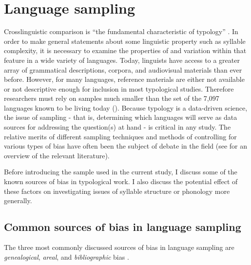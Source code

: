 \section{Language sampling}\label{sec:2.1}

  Crosslinguistic comparison is “the fundamental characteristic of typology” \citep[6]{Croft2003}. In order to make general statements about some linguistic property such as syllable complexity, it is necessary to examine the properties of and variation within that feature in a wide variety of languages. Today, linguists have access to a greater array of grammatical descriptions, corpora, and audiovisual materials than ever before. However, for many languages, reference materials are either not available or not descriptive enough for inclusion in most typological studies. Therefore researchers must rely on samples much smaller than the set of the 7,097 languages known to be living today (\citealt{SimonsFennig2018}). Because typology is a data-driven science, the issue of sampling - that is, determining which languages will serve as data sources for addressing the question(s) at hand - is critical in any study. The relative merits of different sampling techniques and methods of controlling for various types of bias have often been the subject of debate in the field (see \citealt{Bakker2011} for an overview of the relevant literature). 

  Before introducing the sample used in the current study, I discuss some of the known sources of bias in typological work. I also discuss the potential effect of these factors on investigating issues of syllable structure or phonology more generally.

\subsection{Common sources of bias in language sampling}\label{sec:2.1.1}

  The three most commonly discussed sources of bias in language sampling are \textit{genealogical}, \textit{areal}, and \textit{bibliographic} bias \citep{Bakker2011}. 

